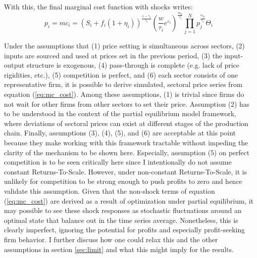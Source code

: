 With this, the final marginal cost function with shocks writes:
\begin{equation}\label{eq:mc_cost}
    p_i = mc_i = \left( S_i + f_i (1+\eta_i) \right)^{\frac{1- \gamma_i}{\gamma_i}} \left(\frac{w}{\tau_i} e^{\varepsilon_i} \right)^{\frac{\alpha_{0i}}{\gamma_i}} \prod_{j=1}^N p_j^{\frac{\alpha_{ji}}{\gamma_i}} \Theta_i
\end{equation}

Under the assumptions that (1) price setting is simultaneous across sectors, (2) inputs are sourced and used at prices set in the 
previous period, (3) the input-output structure is exogenous, (4) pass-through is complete (e.g. lack of price rigidities, etc.),  
(5) competition is perfect, and (6) each sector consists of one representative firm, it is possible to derive simulated, sectoral price 
series from equation (\ref{eq:mc_cost}). Among these assumptions, (1) is trivial since firms do not wait for other firms from other 
sectors to set their price. Assumption (2) has to be understood in the context of the partial equilibrium model framework, where 
deviations of sectoral prices can exist at different stages of the production chain. Finally, assumptions (3), (4), (5), and (6) are 
acceptable at this point because they make working with this framework tractable without impeding the clarity of the mechanism to be 
shown here. Especially, assumption (5) on perfect competition is to be seen critically here since I intentionally do not assume 
constant Returns-To-Scale. However, under non-constant Returns-To-Scale, it is unlikely for competition to be strong enough to push 
profits to zero and hence validate this assumption. Given that the non-shock terms of equation (\ref{eq:mc_cost}) are derived as a result
of optimization under partial equilibrium, it may possible to see these shock responses as stochastic fluctuations around an optimal state that 
balance out in the time series average. Nonetheless, this is clearly imperfect, ignoring the potential for profits and especially 
profit-seeking firm behavior. I further discuss how one could relax this and the other assumptions in section \ref{sec:limit} and what 
this might imply for the results. 


